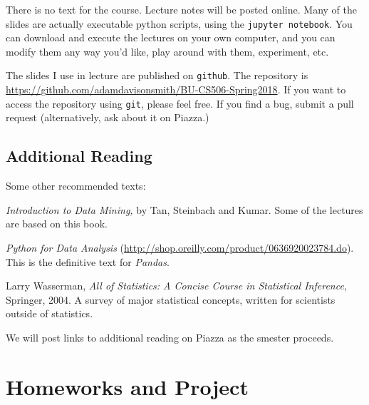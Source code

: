 \documentclass[11pt]{article}
\begin{document}
There is no text for the course.   Lecture notes will be posted online.
Many of the  slides are actually executable python scripts, using the
\texttt{jupyter notebook}.   You can
download and execute the lectures on your own computer, and you can
modify them any way you'd like, play around with them, experiment, etc.

The slides I use in lecture are published on \texttt{github}.   The
repository is
\url{https://github.com/adamdavisonsmith/BU-CS506-Spring2018}.  If you want
to access the repository using \texttt{git}, please feel free.   If you
find a bug, submit a pull request (alternatively, ask
about it on Piazza.)


\subsection*{Additional Reading} 

Some other recommended texts:
\begin{compactitem}
\item \emph{Introduction to Data Mining,} by
Tan, Steinbach and Kumar. Some of the lectures are based on this book.
\item \emph{Python for Data Analysis}
  (\url{http://shop.oreilly.com/product/0636920023784.do}).  This is the
  definitive text for \emph{Pandas}.

\item Larry Wasserman, \emph{All of Statistics: A Concise Course in Statistical
    Inference}, Springer,  2004. A survey of major statistical
  concepts, written for scientists outside of statistics. 

We will post links to additional reading on Piazza as the smester
proceeds. 




\end{compactitem}


 
\section*{Homeworks and Project}
\end{document}
